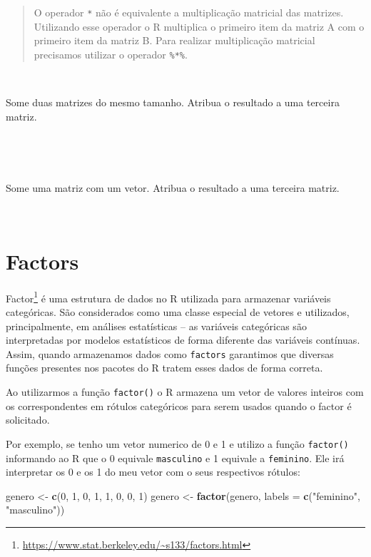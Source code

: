 \documentclass[]{book}
\newenvironment{Shaded}{\begin{snugshade}}{\end{snugshade}}
\newcommand{\DataTypeTok}[1]{\textcolor[rgb]{0.13,0.29,0.53}{#1}}
\newcommand{\DecValTok}[1]{\textcolor[rgb]{0.00,0.00,0.81}{#1}}
\newcommand{\KeywordTok}[1]{\textcolor[rgb]{0.13,0.29,0.53}{\textbf{#1}}}
\newcommand{\NormalTok}[1]{#1}
\newcommand{\StringTok}[1]{\textcolor[rgb]{0.31,0.60,0.02}{#1}}
\let\rmarkdownfootnote\footnote%
\def\footnote{\protect\rmarkdownfootnote}
\theoremstyle{definition}
\theoremstyle{definition}
\theoremstyle{definition}
\theoremstyle{remark}
\let\BeginKnitrBlock\begin \let\EndKnitrBlock\end
\begin{document}
\begin{quote}
O operador \texttt{*} não é equivalente a multiplicação matricial das matrizes. Utilizando esse operador o R multiplica o primeiro item da matriz A com o primeiro item da matriz B. Para realizar multiplicação matricial precisamos utilizar o operador \texttt{\%*\%}.
\end{quote}

~
\BeginKnitrBlock{exercise}
\protect\hypertarget{exr:unnamed-chunk-64}{}{\label{exr:unnamed-chunk-64} }Some duas matrizes do mesmo tamanho. Atribua o resultado a uma terceira matriz.
\EndKnitrBlock{exercise}

~

~
\BeginKnitrBlock{exercise}
\protect\hypertarget{exr:unnamed-chunk-65}{}{\label{exr:unnamed-chunk-65} }Some uma matriz com um vetor. Atribua o resultado a uma terceira matriz.
\EndKnitrBlock{exercise}

~

\hypertarget{factors}{%
\section{Factors}\label{factors}}

Factor\footnote{\url{https://www.stat.berkeley.edu/~s133/factors.html}} é uma estrutura de dados no R utilizada para armazenar variáveis categóricas. São considerados como uma classe especial de vetores e utilizados, principalmente, em análises estatísticas -- as variáveis categóricas são interpretadas por modelos estatísticos de forma diferente das variáveis contínuas. Assim, quando armazenamos dados como \texttt{factors} garantimos que diversas funções presentes nos pacotes do R tratem esses dados de forma correta.

Ao utilizarmos a função \texttt{factor()} o R armazena um vetor de valores inteiros com os correspondentes em rótulos categóricos para serem usados quando o factor é solicitado.

Por exemplo, se tenho um vetor numerico de 0 e 1 e utilizo a função \texttt{factor()} informando ao R que o 0 equivale \texttt{masculino} e 1 equivale a \texttt{feminino}. Ele irá interpretar os 0 e os 1 do meu vetor com o seus respectivos rótulos:

\begin{Shaded}
\begin{Highlighting}[]
\NormalTok{genero <-}\StringTok{ }\KeywordTok{c}\NormalTok{(}\DecValTok{0}\NormalTok{, }\DecValTok{1}\NormalTok{, }\DecValTok{0}\NormalTok{, }\DecValTok{1}\NormalTok{, }\DecValTok{1}\NormalTok{, }\DecValTok{0}\NormalTok{, }\DecValTok{0}\NormalTok{, }\DecValTok{1}\NormalTok{)}
\NormalTok{genero <-}\StringTok{ }\KeywordTok{factor}\NormalTok{(genero, }\DataTypeTok{labels =} \KeywordTok{c}\NormalTok{(}\StringTok{"feminino"}\NormalTok{, }\StringTok{"masculino"}\NormalTok{))}
\end{Highlighting}
\end{Shaded}
\end{document}
